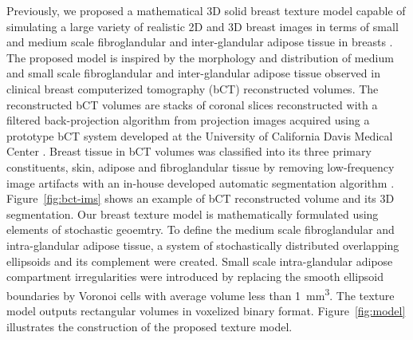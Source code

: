 \documentclass[journal]{IEEEtran}
\begin{document}
Previously, we proposed a mathematical 3D solid breast texture model
capable of simulating a large variety of realistic 2D and 3D breast
images in terms of small and medium scale fibroglandular and
inter-glandular adipose tissue in breasts \cite{li2016novel}. The
proposed model is inspired by the morphology and distribution of
medium and small scale fibroglandular and inter-glandular adipose
tissue observed in clinical breast computerized tomography (bCT)
reconstructed volumes. The reconstructed bCT volumes are stacks of
coronal slices reconstructed with a filtered back-projection algorithm
from projection images acquired using a prototype bCT system developed
at the University of California Davis Medical Center
\cite{lindfors2008dedicated}. Breast tissue in bCT volumes was
classified into its three primary constituents, skin, adipose and
fibroglandular tissue by removing low-frequency image artifacts with
an in-house developed automatic segmentation algorithm
\cite{thomas2015segmentation}. Figure~\ref{fig:bct-ims} shows an
example of bCT reconstructed volume and its 3D segmentation. Our
breast texture model is mathematically formulated using elements of
stochastic geoemtry. To define the medium scale fibroglandular and
intra-glandular adipose tissue, a system of stochastically distributed
overlapping ellipsoids and its complement were created. Small scale
intra-glandular adipose compartment irregularities were introduced by
replacing the smooth ellipsoid boundaries by Voronoi cells with
average volume less than \SI{1}{\mm\cubed}. The texture model outputs
rectangular volumes in voxelized binary format. Figure~\ref{fig:model}
illustrates the construction of the proposed texture model.
\end{document}
